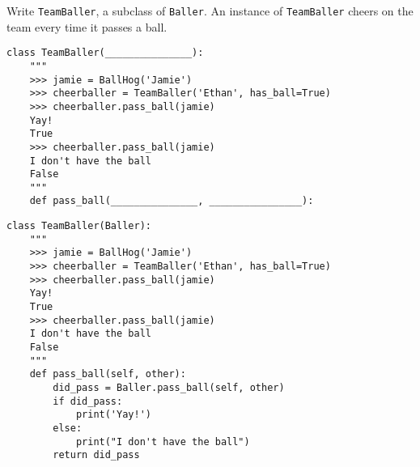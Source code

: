 \begin{blocksection}
\question Write \lstinline$TeamBaller$, a subclass of \lstinline$Baller$. An instance of \lstinline$TeamBaller$ cheers on the team every time it passes a ball.

\ifprintanswers\else
\begin{lstlisting}
class TeamBaller(_______________):
    """
    >>> jamie = BallHog('Jamie')
    >>> cheerballer = TeamBaller('Ethan', has_ball=True)
    >>> cheerballer.pass_ball(jamie)
    Yay!
    True
    >>> cheerballer.pass_ball(jamie)
    I don't have the ball
    False
    """
    def pass_ball(_______________, ________________):
\end{lstlisting}
\fi

\begin{solution}[1in]
\begin{lstlisting}
class TeamBaller(Baller):
    """
    >>> jamie = BallHog('Jamie')
    >>> cheerballer = TeamBaller('Ethan', has_ball=True)
    >>> cheerballer.pass_ball(jamie)
    Yay!
    True
    >>> cheerballer.pass_ball(jamie)
    I don't have the ball
    False
    """
    def pass_ball(self, other):
        did_pass = Baller.pass_ball(self, other)
        if did_pass:
            print('Yay!')
        else:
            print("I don't have the ball")
        return did_pass
\end{lstlisting}
\end{solution}
\end{blocksection}
